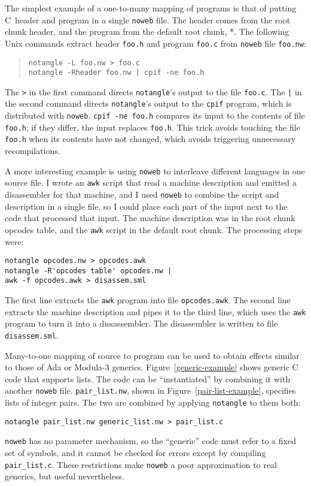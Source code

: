 The simplest example of a one-to-many mapping of programs is that of putting
C~header and program in a single {\tt noweb} file.
The header comes from the root chunk \LA{}header\RA{}, and the program
from the default root chunk, \LA{}*\RA{}.
The following Unix commands extract header \verb+foo.h+ and program
\verb+foo.c+ from {\tt noweb} file \verb+foo.nw+:
\begin{quote} 
\begin{verbatim}
notangle -L foo.nw > foo.c
notangle -Rheader foo.nw | cpif -ne foo.h
\end{verbatim}
\end{quote}
The \verb+>+ in the first command directs \verb+notangle+'s output to
the file \verb+foo.c+.
The \verb+|+ in the second command directs \verb+notangle+'s output to
the \verb+cpif+ program, which is distributed with {\tt noweb}.
\verb+cpif -ne foo.h+ compares its input to the contents of file
\verb+foo.h+;  if they differ, the input replaces \verb+foo.h+.
This trick avoids touching the file \verb+foo.h+ when its contents
have not changed, which avoids triggering unnecessary recompilations.

A more interesting example is using {\tt noweb} to
interleave different languages in one source file. 
I wrote an \verb+awk+
script that read a machine description and emitted a disassembler for
that machine, and I used {\tt noweb} to combine the script and description
in a single file, so I could place each part of the input next to the
code that processed that input. 
The machine description was in the root chunk \LA{}opcodes
table\RA{}, and the \verb+awk+ script in the default root chunk.
The processing steps were:
\begin{verbatim}
notangle opcodes.nw > opcodes.awk
notangle -R'opcodes table' opcodes.nw | 
awk -f opcodes.awk > disassem.sml
\end{verbatim}
The first line extracts the {\tt awk} program into file {\tt opcodes.awk}.
The second line extracts the machine description and pipes it to the
third line, which uses the {\tt awk} program to turn it into a
dissassembler.
The disassembler is written to file {\tt disassem.sml}.

Many-to-one mapping of source to program can be used to obtain
effects similar to those of Ada or Modula-3 generics.
Figure~\ref{generic-example} shows generic C code that supports lists.
The code can be
``instantiated'' by combining it with another \verb+noweb+ file.
\verb+pair_list.nw+, shown in Figure~\ref{pair-list-example}, specifies
 lists of integer pairs.
The two are combined by applying \verb+notangle+ to them both:
\begin{verbatim}
notangle pair_list.nw generic_list.nw > pair_list.c
\end{verbatim} 
{\tt noweb} has no parameter mechanism, so the ``generic'' code must
refer to a fixed set of symbols, and it cannot be checked for errors
except by compiling \verb+pair_list.c+.
These restrictions make {\tt noweb} a poor approximation to real
generics, but useful nevertheless.

